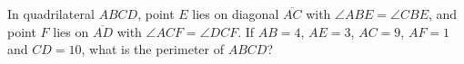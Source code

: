 In quadrilateral $ABCD$, point $E$ lies on diagonal $\overline{AC}$ with $\angle ABE=\angle CBE$, and point $F$ lies on $\overline{AD}$ with $\angle ACF=\angle DCF$. If $AB=4$, $AE=3$, $AC=9$, $AF=1$ and $CD=10$, what is the perimeter of $ABCD$?
